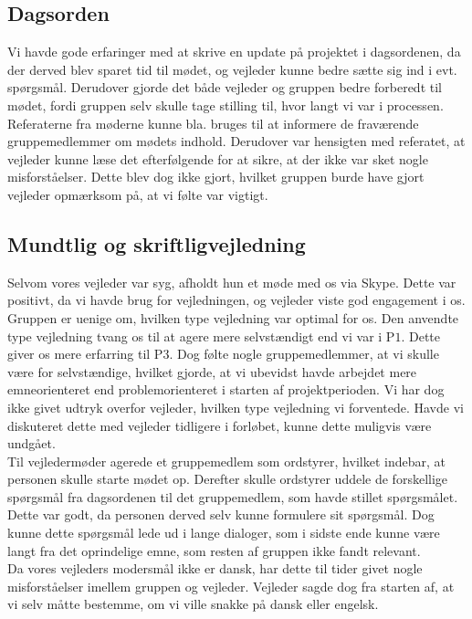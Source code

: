 \subsection{Dagsorden}
Vi havde gode erfaringer med at skrive en update på projektet i dagsordenen, da der derved blev sparet tid til mødet, og vejleder kunne bedre sætte sig ind i evt. spørgsmål. Derudover gjorde det både vejleder og gruppen bedre forberedt til mødet, fordi gruppen selv skulle tage stilling til, hvor langt vi var i processen. \\
Referaterne fra møderne kunne bla. bruges til at informere de fraværende gruppemedlemmer om mødets indhold. Derudover var hensigten med referatet, at vejleder kunne læse det efterfølgende for at sikre, at der ikke var sket nogle misforståelser. Dette blev dog ikke gjort, hvilket gruppen burde have gjort vejleder opmærksom på, at vi følte var vigtigt. 
	
\subsection{Mundtlig og skriftligvejledning}
Selvom vores vejleder var syg, afholdt hun et møde med os via Skype. Dette var positivt, da vi havde brug for vejledningen, og vejleder viste god engagement i os. \\
Gruppen er uenige om, hvilken type vejledning var optimal for os. Den anvendte type vejledning tvang os til at agere mere selvstændigt end vi var i P$1$. Dette giver os mere erfarring til P$3$. Dog følte nogle gruppemedlemmer, at vi skulle være for selvstændige, hvilket gjorde, at vi ubevidst havde arbejdet mere emneorienteret end problemorienteret i starten af projektperioden. Vi har dog ikke givet udtryk overfor vejleder, hvilken type vejledning vi forventede. Havde vi diskuteret dette med vejleder tidligere i forløbet, kunne dette muligvis være undgået. \\
Til vejledermøder agerede et gruppemedlem som ordstyrer, hvilket indebar, at personen skulle starte mødet op. Derefter skulle ordstyrer uddele de forskellige spørgsmål fra dagsordenen til det gruppemedlem, som havde stillet spørgsmålet. Dette var godt, da personen derved selv kunne formulere sit spørgsmål.
Dog kunne dette spørgsmål lede ud i lange dialoger, som i sidste ende kunne være langt fra det oprindelige emne, som resten af gruppen ikke fandt relevant. \\ %
Da vores vejleders modersmål ikke er dansk, har dette til tider givet nogle misforståelser imellem gruppen og vejleder. Vejleder sagde dog fra starten af, at vi selv måtte bestemme, om vi ville snakke på dansk eller engelsk.
	
